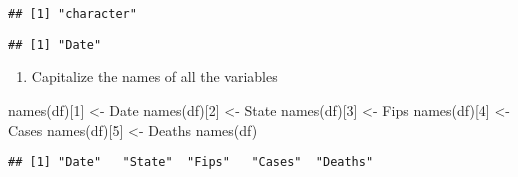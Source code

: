 \documentclass[
]{article}
\newenvironment{Shaded}{\begin{snugshade}}{\end{snugshade}}
\newcommand{\DecValTok}[1]{\textcolor[rgb]{0.00,0.00,0.81}{#1}}
\newcommand{\FunctionTok}[1]{\textcolor[rgb]{0.00,0.00,0.00}{#1}}
\newcommand{\NormalTok}[1]{#1}
\newcommand{\OtherTok}[1]{\textcolor[rgb]{0.56,0.35,0.01}{#1}}
\newcommand{\SpecialCharTok}[1]{\textcolor[rgb]{0.00,0.00,0.00}{#1}}
\newcommand{\StringTok}[1]{\textcolor[rgb]{0.31,0.60,0.02}{#1}}
\providecommand{\tightlist}{%
  \setlength{\itemsep}{0pt}\setlength{\parskip}{0pt}}
\begin{document}
\begin{Shaded}
\end{Shaded}

\begin{verbatim}
## [1] "character"
\end{verbatim}

\begin{Shaded}
\end{Shaded}

\begin{verbatim}
## [1] "Date"
\end{verbatim}

\begin{enumerate}
\def\labelenumi{\arabic{enumi}.}
\setcounter{enumi}{5}
\tightlist
\item
  Capitalize the names of all the variables
\end{enumerate}

\begin{Shaded}
\begin{Highlighting}[]
\FunctionTok{names}\NormalTok{(df)[}\DecValTok{1}\NormalTok{] }\OtherTok{\textless{}{-}} \StringTok{\textquotesingle{}Date\textquotesingle{}}
\FunctionTok{names}\NormalTok{(df)[}\DecValTok{2}\NormalTok{] }\OtherTok{\textless{}{-}} \StringTok{\textquotesingle{}State\textquotesingle{}}
\FunctionTok{names}\NormalTok{(df)[}\DecValTok{3}\NormalTok{] }\OtherTok{\textless{}{-}} \StringTok{\textquotesingle{}Fips\textquotesingle{}}
\FunctionTok{names}\NormalTok{(df)[}\DecValTok{4}\NormalTok{] }\OtherTok{\textless{}{-}} \StringTok{\textquotesingle{}Cases\textquotesingle{}}
\FunctionTok{names}\NormalTok{(df)[}\DecValTok{5}\NormalTok{] }\OtherTok{\textless{}{-}} \StringTok{\textquotesingle{}Deaths\textquotesingle{}}
\FunctionTok{names}\NormalTok{(df)}
\end{Highlighting}
\end{Shaded}

\begin{verbatim}
## [1] "Date"   "State"  "Fips"   "Cases"  "Deaths"
\end{verbatim}
\end{document}
